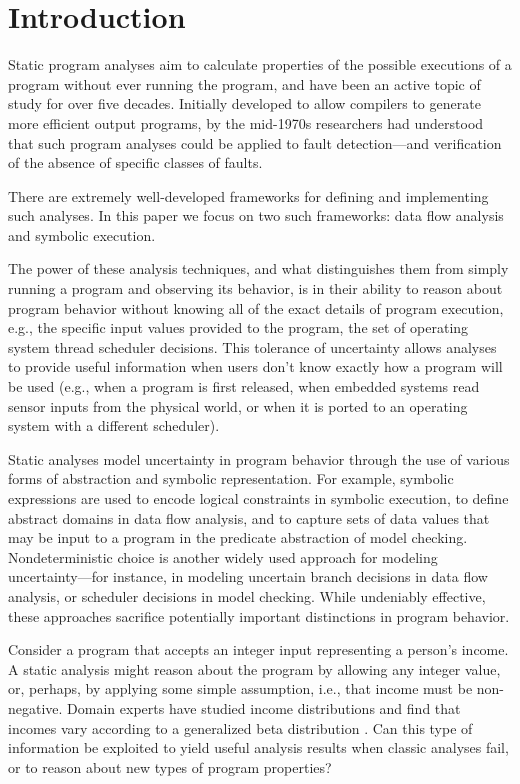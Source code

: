 \section{Introduction}
\label{sec:introduction}

Static program analyses aim to calculate properties of 
the possible executions of a program without ever running the program,
and have been an active topic of study for over five decades.
Initially developed to allow compilers to generate more efficient
output programs, by the mid-1970s \cite{fosdick1976data} researchers had
understood that such program analyses could be applied to fault
detection---and verification of the absence of specific classes of faults.

There are extremely well-developed frameworks for defining
and implementing such analyses.  In this paper we focus on two
such frameworks: data flow analysis and symbolic execution.

The power of these analysis techniques, and what distinguishes them from
simply running a program and observing its behavior, is in their
ability to reason about program behavior without knowing all of the
exact details of program execution, e.g., the specific 
input values provided to the program, the set of operating system
thread scheduler decisions.  This tolerance of uncertainty allows analyses
to provide useful information when users don't know exactly how
a program will be used (e.g., when a program is first released, when
embedded systems read sensor inputs from the physical world, or
when it is ported to an operating system with a different scheduler).

Static analyses model uncertainty in program behavior
through the use of various forms of abstraction and symbolic representation.
For example, symbolic expressions are used to encode logical constraints 
in symbolic execution, to define abstract domains
in data flow analysis, and to capture sets of data values that may be input
to a program in the predicate abstraction of model checking.
Nondeterministic choice is another widely used approach for modeling
uncertainty---for instance, in modeling uncertain branch 
decisions in data flow analysis,
or scheduler decisions in model checking.
While undeniably effective, these approaches sacrifice potentially
important distinctions in program behavior.   

Consider a program that accepts an integer input representing
a person's income.  A static analysis might reason about the program
by allowing any integer value, or, perhaps, by applying
some simple assumption, i.e., that income must be non-negative.
Domain experts have studied income distributions and find that
incomes vary according to a generalized beta distribution 
\cite{mcdonald1984some,thurow1970analyzing}.  Can this type of information be 
exploited to yield useful analysis results when classic
analyses fail, or to reason about new types of program properties?

